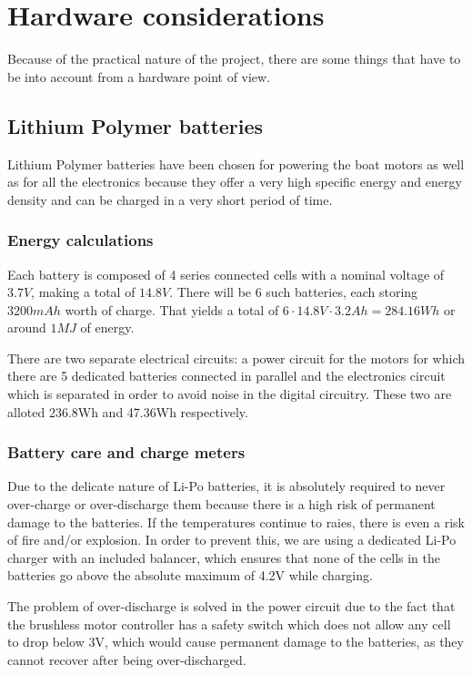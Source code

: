 \chapter{Hardware considerations}

Because of the practical nature of the project, there are some things that have to be into account from a hardware point of view.

\section{Lithium Polymer batteries}

	Lithium Polymer batteries have been chosen for powering the boat motors as well as for all the electronics because they offer a very high specific energy and energy density and can be charged in a very short period of time. 

	\subsection{Energy calculations}
	
	Each battery is composed of 4 series connected cells with a nominal voltage of $ 3.7V $, making a total of $ 14.8V $. There will be 6 such batteries, each storing $ 3200mAh $ worth of charge. That yields a total of $ 6 \cdot 14.8V \cdot 3.2Ah = 284.16Wh $ or around $ 1MJ $ of energy.
	
	There are two separate electrical circuits: a power circuit for the motors for which there are 5 dedicated batteries connected in parallel and the electronics circuit which is separated in order to avoid noise in the digital circuitry. These two are alloted 236.8Wh and 47.36Wh respectively.
	
	\subsection{Battery care and charge meters}
	
	Due to the delicate nature of Li-Po batteries, it is absolutely required to never over-charge or over-discharge them because there is a high risk of permanent damage to the batteries. If the temperatures continue to raies, there is even a risk of fire and/or explosion. In order to prevent this, we are using a dedicated Li-Po charger with an included balancer, which ensures that none of the cells in the batteries go above the absolute maximum of 4.2V while charging.
	
	The problem of over-discharge is solved in the power circuit due to the fact that the brushless motor controller has a safety switch which does not allow any cell to drop below 3V, which would cause permanent damage to the batteries, as they cannot recover after being over-discharged. 
	
